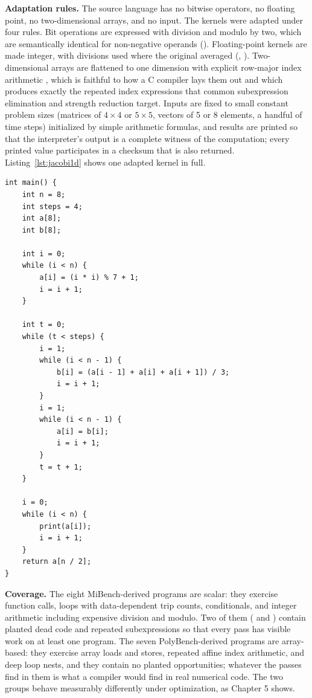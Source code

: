 \textbf{Adaptation rules.} The source language has no bitwise operators, no floating point, no two-dimensional arrays, and no input. The kernels were adapted under four rules. Bit operations are expressed with division and modulo by two, which are semantically identical for non-negative operands (). Floating-point kernels are made integer, with divisions used where the original averaged (, ). Two-dimensional arrays are flattened to one dimension with explicit row-major index arithmetic , which is faithful to how a C compiler lays them out and which produces exactly the repeated index expressions that common subexpression elimination and strength reduction target. Inputs are fixed to small constant problem sizes (matrices of $4\times4$ or $5\times5$, vectors of 5 or 8 elements, a handful of time steps) initialized by simple arithmetic formulas, and results are printed so that the interpreter's output is a complete witness of the computation; every printed value participates in a checksum that is also returned. Listing~\ref{lst:jacobi1d} shows one adapted kernel in full.

\begin{lstlisting}[language=CSubset, caption={The \code{jacobi1d} benchmark, adapted from PolyBench/C stencils/jacobi-1d. Two buffers alternate over four time steps; each interior element becomes the integer mean of itself and its two neighbours.}, label={lst:jacobi1d}]
int main() {
    int n = 8;
    int steps = 4;
    int a[8];
    int b[8];

    int i = 0;
    while (i < n) {
        a[i] = (i * i) % 7 + 1;
        i = i + 1;
    }

    int t = 0;
    while (t < steps) {
        i = 1;
        while (i < n - 1) {
            b[i] = (a[i - 1] + a[i] + a[i + 1]) / 3;
            i = i + 1;
        }
        i = 1;
        while (i < n - 1) {
            a[i] = b[i];
            i = i + 1;
        }
        t = t + 1;
    }

    i = 0;
    while (i < n) {
        print(a[i]);
        i = i + 1;
    }
    return a[n / 2];
}
\end{lstlisting}

\textbf{Coverage.} The eight MiBench-derived programs are scalar: they exercise function calls, loops with data-dependent trip counts, conditionals, and integer arithmetic including expensive division and modulo. Two of them ( and ) contain planted dead code and repeated subexpressions so that every pass has visible work on at least one program. The seven PolyBench-derived programs are array-based: they exercise array loads and stores, repeated affine index arithmetic, and deep loop nests, and they contain no planted opportunities; whatever the passes find in them is what a compiler would find in real numerical code. The two groups behave measurably differently under optimization, as Chapter 5 shows.

